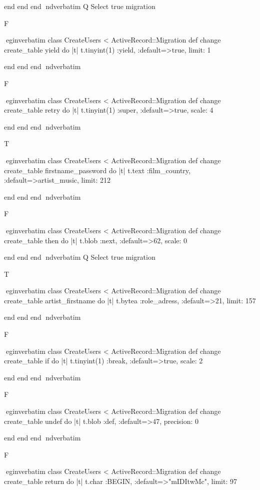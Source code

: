     end 
  end 
end
nd{verbatim}
Q
 Select true migration

F

egin{verbatim}
 class CreateUsers < ActiveRecord::Migration 
  def change 
    create_table yield do |t| 
      t.tinyint(1) :yield, :default=>true, limit: 1
    
    end 
  end 
end
nd{verbatim}

F

egin{verbatim}
 class CreateUsers < ActiveRecord::Migration 
  def change 
    create_table retry do |t| 
      t.tinyint(1) :super, :default=>true, scale: 4
    
    end 
  end 
end
nd{verbatim}

T

egin{verbatim}
 class CreateUsers < ActiveRecord::Migration 
  def change 
    create_table firstname_password do |t| 
      t.text :film_country, :default=>artist_music, limit: 212
    
    end 
  end 
end
nd{verbatim}

F

egin{verbatim}
 class CreateUsers < ActiveRecord::Migration 
  def change 
    create_table then do |t| 
      t.blob :next, :default=>62, scale: 0
    
    end 
  end 
end
nd{verbatim}
Q
 Select true migration

T

egin{verbatim}
 class CreateUsers < ActiveRecord::Migration 
  def change 
    create_table artist_firstname do |t| 
      t.bytea :role_adress, :default=>21, limit: 157
    
    end 
  end 
end
nd{verbatim}

F

egin{verbatim}
 class CreateUsers < ActiveRecord::Migration 
  def change 
    create_table if do |t| 
      t.tinyint(1) :break, :default=>true, scale: 2
    
    end 
  end 
end
nd{verbatim}

F

egin{verbatim}
 class CreateUsers < ActiveRecord::Migration 
  def change 
    create_table undef do |t| 
      t.blob :def, :default=>47, precision: 0
    
    end 
  end 
end
nd{verbatim}

F

egin{verbatim}
 class CreateUsers < ActiveRecord::Migration 
  def change 
    create_table return do |t| 
      t.char :BEGIN, :default=>"mIDItwMc", limit: 97
    
